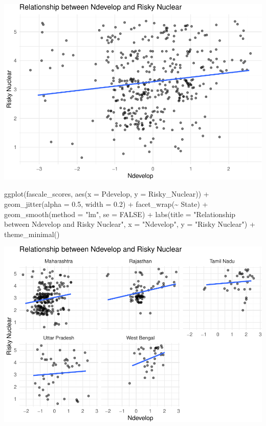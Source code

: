 \documentclass[
]{article}
\newenvironment{Shaded}{\begin{snugshade}}{\end{snugshade}}
\newcommand{\AttributeTok}[1]{\textcolor[rgb]{0.77,0.63,0.00}{#1}}
\newcommand{\ConstantTok}[1]{\textcolor[rgb]{0.00,0.00,0.00}{#1}}
\newcommand{\FloatTok}[1]{\textcolor[rgb]{0.00,0.00,0.81}{#1}}
\newcommand{\FunctionTok}[1]{\textcolor[rgb]{0.00,0.00,0.00}{#1}}
\newcommand{\NormalTok}[1]{#1}
\newcommand{\SpecialCharTok}[1]{\textcolor[rgb]{0.00,0.00,0.00}{#1}}
\newcommand{\StringTok}[1]{\textcolor[rgb]{0.31,0.60,0.02}{#1}}
\begin{document}
\includegraphics{Paper1_files/figure-latex/unnamed-chunk-25-2.pdf}

\begin{Shaded}
\begin{Highlighting}[]
\FunctionTok{ggplot}\NormalTok{(fascale\_scores, }\FunctionTok{aes}\NormalTok{(}\AttributeTok{x =}\NormalTok{ Pdevelop, }\AttributeTok{y =}\NormalTok{ Risky\_Nuclear)) }\SpecialCharTok{+}
  \FunctionTok{geom\_jitter}\NormalTok{(}\AttributeTok{alpha =} \FloatTok{0.5}\NormalTok{, }\AttributeTok{width =} \FloatTok{0.2}\NormalTok{) }\SpecialCharTok{+}
  \FunctionTok{facet\_wrap}\NormalTok{(}\SpecialCharTok{\textasciitilde{}}\NormalTok{ State) }\SpecialCharTok{+}
  \FunctionTok{geom\_smooth}\NormalTok{(}\AttributeTok{method =} \StringTok{"lm"}\NormalTok{, }\AttributeTok{se =} \ConstantTok{FALSE}\NormalTok{) }\SpecialCharTok{+}
  \FunctionTok{labs}\NormalTok{(}\AttributeTok{title =} \StringTok{"Relationship between Ndevelop and Risky Nuclear"}\NormalTok{,}
       \AttributeTok{x =} \StringTok{"Ndevelop"}\NormalTok{,}
       \AttributeTok{y =} \StringTok{"Risky Nuclear"}\NormalTok{) }\SpecialCharTok{+}
  \FunctionTok{theme\_minimal}\NormalTok{()}
\end{Highlighting}
\end{Shaded}

\includegraphics{Paper1_files/figure-latex/unnamed-chunk-25-3.pdf}
\end{document}
